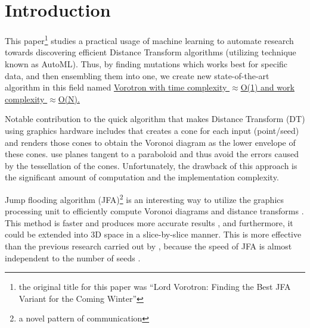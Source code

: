 \documentclass[format=acmsmall,screen,review,authordraft,nonacm]{acmart}
\newcommand{\ourjfa}{Vorotron} %
\begin{document}


\maketitle

\section{Introduction} %

This paper\footnote{the original title for this paper was ``Lord Vorotron:
Finding the Best JFA Variant for the Coming Winter''} studies a practical usage of machine learning to automate research
towards discovering efficient Distance Transform algorithms (utilizing technique known as AutoML).
Thus, by finding mutations which works best for specific data, and then ensembling them into
one, we create new state-of-the-art algorithm in this field named \uline{\ourjfa \hspace{0.01cm} with
time complexity $\approx$O(1) and work complexity $\approx$O(N).}

Notable contribution to the quick algorithm that makes Distance Transform (DT)
using graphics hardware includes \citep{hoff1999fast} that creates a cone for
each input (point/seed) and renders those cones to obtain the Voronoi diagram as the lower envelope of these cones.
\cite{fischer2006fast} use planes tangent to a paraboloid and thus avoid the errors caused by the tessellation of the cones.
Unfortunately, the drawback of this approach is the significant amount of computation and the implementation complexity.

Jump flooding algorithm (JFA)\footnote{a novel pattern of
communication} is an interesting way to utilize the graphics processing unit to
efficiently compute Voronoi diagrams and distance transforms
\cite{rong2006jump}. This method is faster and produces more accurate results
\cite{rong2007variants}, and furthermore, it could be extended into 3D space in a slice-by-slice manner.
This is more effective than the previous research carried out by
\citep{sud2006interactive}, because the speed of JFA is almost independent to the number of seeds \cite{rong2007variants}.
\end{document}
